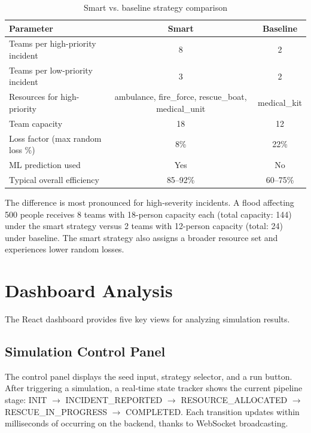 \begin{table}[H]
\centering
\caption{Smart vs. baseline strategy comparison}
\label{tab:strategy_comparison}
\begin{tabular}{|l|c|c|}
\hline
\textbf{Parameter} & \textbf{Smart} & \textbf{Baseline} \\
\hline
Teams per high-priority incident & 8 & 2 \\
\hline
Teams per low-priority incident & 3 & 2 \\
\hline
Resources for high-priority & ambulance, fire\_force, rescue\_boat, medical\_unit & medical\_kit \\
\hline
Team capacity & 18 & 12 \\
\hline
Loss factor (max random loss \%) & 8\% & 22\% \\
\hline
ML prediction used & Yes & No \\
\hline
Typical overall efficiency & 85--92\% & 60--75\% \\
\hline
\end{tabular}
\end{table}

The difference is most pronounced for high-severity incidents. A flood affecting 500 people receives 8 teams with 18-person capacity each (total capacity: 144) under the smart strategy versus 2 teams with 12-person capacity (total: 24) under baseline. The smart strategy also assigns a broader resource set and experiences lower random losses.

\section{Dashboard Analysis}
\label{sec:dashboard_analysis}

The React dashboard provides five key views for analyzing simulation results.

\subsection{Simulation Control Panel}

The control panel displays the seed input, strategy selector, and a run button. After triggering a simulation, a real-time state tracker shows the current pipeline stage: INIT $\rightarrow$ INCIDENT\_REPORTED $\rightarrow$ RESOURCE\_ALLOCATED $\rightarrow$ RESCUE\_IN\_PROGRESS $\rightarrow$ COMPLETED. Each transition updates within milliseconds of occurring on the backend, thanks to WebSocket broadcasting.


